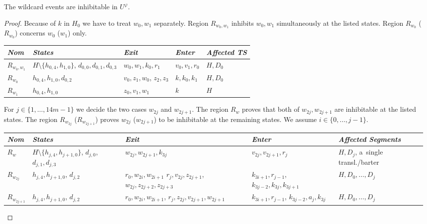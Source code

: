 \documentclass[english]{lipics_hacked}
\begin{document}
\begin{lemma}
\label{lemma:wildcards}
The wildcard events are inhibitable in $U^\varphi$.
\end{lemma}
%
\begin{proof}
Because of $k$ in $H_0$ we have to treat $w_0,w_1$ separately.
Region $R_{w_0,w_1}$ inhibits $w_0,w_1$ simultaneously at the listed states.
Region $R_{w_0}$ ($R_{w_0}$) concerns $w_0$ ($w_1$) only.
\begin{longtable}{p{0.9cm} p{3cm}   p{2.5cm}    p{2.5cm}      p{2.7cm}  }
\textit{Nom} &\textit{States} & \textit{Exit} & \textit{Enter} & \textit{Affected TS}  \\ \hline
$R_{w_0,w_1}$ & $H\setminus \{h_{0,4},h_{1,0}\}$, $d_{0,0},d_{0,1},d_{0,3}$ & $w_0,w_1,k_0,r_1$ &  $v_0,v_1,r_0$& $H,D_0$ \\
 $R_{w_0}$ & $h_{0,4},h_{1,0},d_{0,2}$ & $v_0,z_1,w_0$, $z_2,z_3$ & $ k,k_0,k_1 $& $H,D_0$ \\	
 $R_{w_1}$& $h_{0,4},h_{1,0}$& $z_0,v_1,w_1$ & $k$&  $H$\\							
\end{longtable}
%
For $j\in \{1,\ldots,14m-1\}$ we decide the two cases $w_{2j}$ and $w_{2j+1}$.
The region $R_w$ proves that both of $w_{2j},w_{2j+1}$ are inhibitable at the listed states.
The region $R_{w_{2j}}$ ($R_{w_{2j+1}}$) proves $w_{2j}$ ($w_{2j+1}$) to be inhibitable at the remaining states.
We assume $ i\in \{0,\dots,j-1\}$.
%
\begin{longtable}{p{0.7cm} p{3cm}   p{2.5cm}    p{2.5cm}      p{2.7cm}  }
\textit{Nom} &\textit{States} & \textit{Exit} & \textit{Enter} & \textit{Affected Segments}  \\ \hline
$R_w$& $H\setminus\{h_{j,4},h_{j+1,0}\}$, $d_{j,0}$, $d_{j,1},d_{j,3}$ & $w_{2j},w_{2j+1},k_{3j}$ & $v_{2j},v_{2j+1},r_j$ & $H,D_j$, a~single transl./barter\\
 $R_{w_{2j}}$& $h_{j,4},h_{j+1,0}$, $d_{j,2}$ & $r_0,w_{2i},w_{2i+1}$ $r_j,v_{2j},z_{2j+1}$, $w_{2j},z_{2j+2},z_{2j+3}$  & $k_{3i+1},r_{j-1}$, $ k_{3j-2},k_{3j},k_{3j+1}$ & $H,D_0,\dots,D_j$ \\	
$R_{w_{2j+1}}$ &$h_{j,4},h_{j+1,0}$, $d_{j,2}$& $r_0,w_{2i},w_{2i+1}$, $r_j,z_{2j},v_{2j+1},w_{2j+1}$ & $k_{3i+1},r_{j-1}$, $k_{3j-2},a_j,k_{3j}$& $H,D_0,\dots,D_j$ \\	\end{longtable}
\end{proof}
\end{document}
